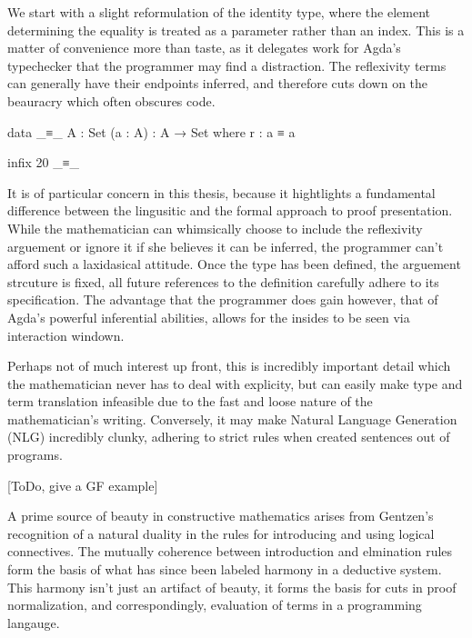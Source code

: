 \documentclass[11pt, a4paper]{article}
\begin{document}
We start with a slight reformulation of the identity type, where the element
determining the equality is treated as a parameter rather than an index. This
is a matter of convenience more than taste, as it delegates work for Agda's
typechecker that the programmer may find a distraction. The reflexivity terms
can generally have their endpoints inferred, and therefore cuts down on the
beauracry which often obscures code. 

\begin{code}

  data _≡_ {A : Set} (a : A) : A → Set where
    r : a ≡ a

  infix 20 _≡_

\end{code}

It is of particular concern in this thesis, because it hightlights a
fundamental difference between the lingusitic and the formal approach to proof
presentation.  While the mathematician can whimsically choose to include the
reflexivity arguement or ignore it if she believes it can be inferred, the
programmer can't afford such a laxidasical attitude. Once the type has been
defined, the arguement strcuture is fixed, all future references to the
definition carefully adhere to its specification. The advantage that the
programmer does gain however, that of Agda's powerful inferential abilities,
allows for the insides to be seen via interaction windown. 

Perhaps not of much interest up front, this is incredibly important detail
which the mathematician never has to deal with explicity, but can easily make
type and term translation infeasible due to the fast and loose nature of the
mathematician's writing. Conversely, it may make Natural Language Generation
(NLG) incredibly clunky, adhering to strict rules when created sentences out of
programs. 

[ToDo, give a GF example]

A prime source of beauty in constructive mathematics arises from Gentzen's
recognition of a natural duality in the rules for introducing and using logical
connectives. The mutually coherence between introduction and elmination rules
form the basis of what has since been labeled harmony in a deductive system.
This harmony isn't just an artifact of beauty, it forms the basis for cuts in
proof normalization, and correspondingly, evaluation of terms in a programming
langauge. 
\end{document}
